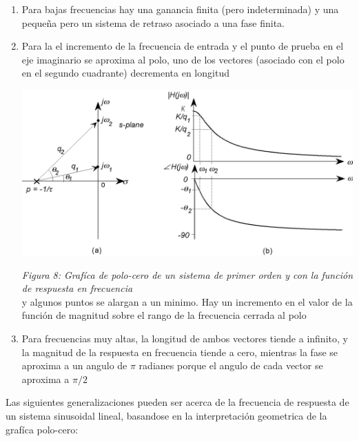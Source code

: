 \documentclass[10pt,a4paper]{article}
\begin{document}
\begin{enumerate}
  \item Para bajas frecuencias hay una ganancia finita (pero indeterminada) y una pequeña pero un sistema de retraso asociado a una fase finita.
  \item Para la el incremento de la frecuencia de entrada y el punto de prueba en el eje imaginario se aproxima al polo, uno de los vectores (asociado con el polo en el segundo cuadrante) decrementa en longitud
  \clearpage
  \begin{center}
    \includegraphics[scale=0.25]{img/figura8.png}
  \end{center}
  \textit{Figura 8: Grafíca de polo-cero de un sistema de primer orden y con la función de respuesta en frecuencia}\\
  \vspace{0.25cm}
  y algunos puntos se alargan a un minimo. Hay un incremento en el valor de la función de magnitud sobre el rango de la frecuencia cerrada al polo
  \item Para frecuencias muy altas, la longitud de ambos vectores tiende a infinito, y la magnitud de la respuesta en frecuencia tiende a cero, mientras la fase se aproxima a un angulo de $\pi$ radianes porque el angulo de cada vector se aproxima a $\pi/2$
\end{enumerate}
Las siguientes generalizaciones pueden ser acerca de la frecuencia de respuesta de un sistema sinusoidal lineal, basandose en la interpretación geometrica de la grafíca polo-cero:
\end{document}
